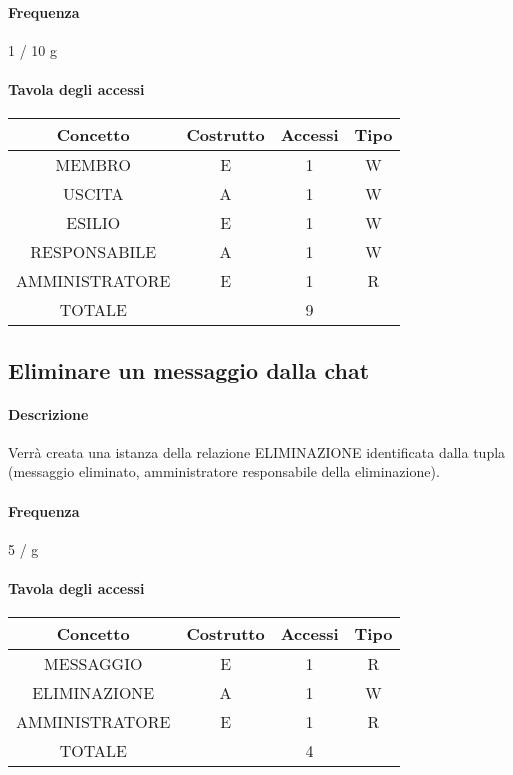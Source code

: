 \documentclass[a4paper,12pt]{report}
\begin{document}
\paragraph{Frequenza} 1 / 10 g
\begin{table}[H]
\paragraph{Tavola degli accessi\newline}
\begin{tabular}{|c|c|c|c|}
\hline
Concetto       & Costrutto & Accessi & Tipo \\ \hline
MEMBRO         & E         & 1       & W    \\ \hline
USCITA         & A         & 1       & W    \\ \hline
ESILIO         & E         & 1       & W    \\ \hline
RESPONSABILE   & A         & 1       & W    \\ \hline
AMMINISTRATORE & E         & 1       & R    \\ \hline
TOTALE         &           & 9       &      \\ \hline
\end{tabular}
\end{table}
\subsection{Eliminare un messaggio dalla chat} \label{eliminare_messaggio}
\paragraph{Descrizione} Verrà creata una istanza della relazione ELIMINAZIONE identificata dalla tupla (messaggio eliminato, amministratore responsabile della eliminazione).
\paragraph{Frequenza} 5 / g
\begin{table}[H]
\paragraph{Tavola degli accessi\newline}
\begin{tabular}{|c|c|c|c|}
\hline
Concetto       & Costrutto & Accessi & Tipo \\ \hline
MESSAGGIO      & E         & 1       & R    \\ \hline
ELIMINAZIONE   & A         & 1       & W    \\ \hline
AMMINISTRATORE & E         & 1       & R    \\ \hline
TOTALE         &           & 4       &      \\ \hline
\end{tabular}
\end{table}
\end{document}
